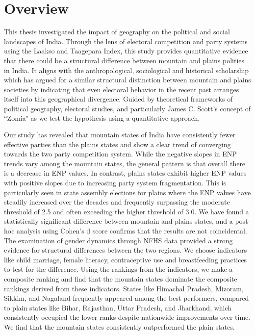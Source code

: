 \begin{sloppypar}

\section{Overview}
This thesis investigated the impact of geography on the political and social landscapes of India. Through the lens of electoral competition and party systems using the Laakso and Taagepara Index, this study provides quantitative evidence that there could be a structural difference between mountain and plains polities in India. It aligns with the anthropological, sociological and historical scholarship which has argued for a similar structural distinction between mountain and plains societies by indicating that even electoral behavior in the recent past arranges itself into this geographical divergence. Guided by  theoretical frameworks of political geography, electoral studies, and particularly James C. Scott's concept of ``Zomia" as we test the hypothesis using a quantitative approach.


Our study has revealed that mountain states of India have consistently fewer effective parties than the plains states and show a clear trend of converging towards the two party competition system. While the negative slopes in ENP trends vary among the mountain states, the general pattern is that overall there is a decrease in ENP values. In contrast, plains states exhibit higher ENP values with positive slopes due to increasing party system fragmentation. This is particularly seen in state assembly elections for plains where the ENP values have steadily increased over the decades and frequently surpassing the moderate threshold of 2.5 and often exceeding the higher threshold of 3.0. We have found a statistically significant difference between mountain and plains states, and a post-hoc analysis using Cohen’s d score confirms that the results are not coincidental. The examination of gender dynamics through NFHS data provided a strong evidence for structural differences between the two regions. We choose indicators like child marriage, female literacy, contraceptive use and breastfeeding practices to test for the difference.  Using the rankings from the indicators, we make a composite ranking and find that the mountain states dominate the composite rankings derived from these indicators. States like Himachal Pradesh, Mizoram, Sikkim, and Nagaland frequently appeared among the best performers, compared to plain states like Bihar, Rajasthan, Uttar Pradesh, and Jharkhand, which consistently occupied the lower ranks despite nationwide improvements over time. We find that the mountain states consistently outperformed the plain states. 


\end{sloppypar}
